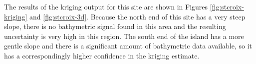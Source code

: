 The results of the kriging output for this site are shown in Figures \ref{fig:stcroix-kriging} and \ref{fig:stcroix-3d}. Because the north end of this site has a very steep slope, there is no bathymetric signal found in this area and the resulting uncertainty is very high in this region. The south end of the island has a more gentle slope and there is a significant amount of bathymetric data available, so it has a correspondingly higher confidence in the kriging estimate.

\begin{figure}[!ht]
    \begin{floatrow}
    \end{floatrow}
\end{figure}

